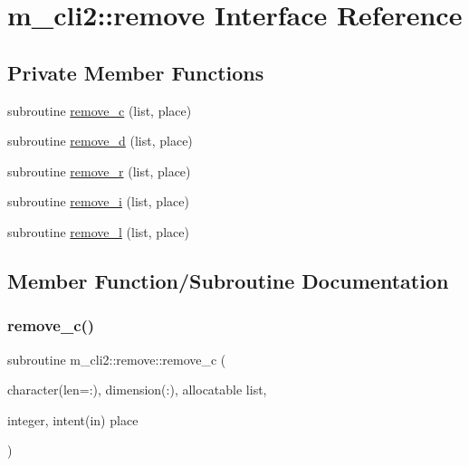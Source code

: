 \hypertarget{interfacem__cli2_1_1remove}{}\section{m\+\_\+cli2\+:\+:remove Interface Reference}
\label{interfacem__cli2_1_1remove}
\subsection*{Private Member Functions}
\begin{DoxyCompactItemize}
\item 
subroutine \mbox{\hyperlink{interfacem__cli2_1_1remove_aae13960af6c9ed2af46fdfec8e66a8a2}{remove\+\_\+c}} (list, place)
\item 
subroutine \mbox{\hyperlink{interfacem__cli2_1_1remove_a0d123599053c144f5ab233b735a38f1d}{remove\+\_\+d}} (list, place)
\item 
subroutine \mbox{\hyperlink{interfacem__cli2_1_1remove_a13995f1150dcabb9127cfeb30a629406}{remove\+\_\+r}} (list, place)
\item 
subroutine \mbox{\hyperlink{interfacem__cli2_1_1remove_a4a30f737b41e6cfca58ef2842d633b27}{remove\+\_\+i}} (list, place)
\item 
subroutine \mbox{\hyperlink{interfacem__cli2_1_1remove_a72934a0b165dc3d178ff7cbe6117a5b3}{remove\+\_\+l}} (list, place)
\end{DoxyCompactItemize}


\subsection{Member Function/\+Subroutine Documentation}
\mbox{\label{interfacem__cli2_1_1remove_aae13960af6c9ed2af46fdfec8e66a8a2}} 
\subsubsection{\texorpdfstring{remove\+\_\+c()}{remove\_c()}}
{\footnotesize\ttfamily subroutine m\+\_\+cli2\+::remove\+::remove\+\_\+c (\begin{DoxyParamCaption}\item[{character(len=\+:), dimension(\+:), allocatable}]{list,  }\item[{integer, intent(in)}]{place }\end{DoxyParamCaption})\hspace{0.3cm}{\ttfamily [private]}}

